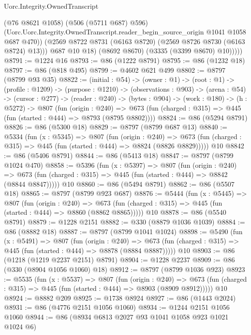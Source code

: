 \begin{lexlean}{Uorc.Integrity.OwnedTranscript}
\begin{coremodule}
                  (@76 @8621 @1058)
                  (@506 (@5711 @687) @596)
                  (Uorc.Uorc.Integrity.OwnedTranscript.reader_begin_source_origin
                    @1041
                    @1058
                    @687
                    @470))
                (@2569 @8722 @8731 (@6163 @8720) (@2569 @8726 @8730 (@6163 @8724) @13)))
              @687
              @10
              @18)
            (@8692 @8670)
            (@3335 (@3399 @8670) @10)))))
@8791 := @1224 @16
@8793 := @86 (@1222 @8791)
@8795 := @86 (@1232 @18)
@8797 := @86 (@818 @495)
@8799 := @4602 @621 @499
@8802 := @8797 (@8799 @93 @35)
@8822 := (initial : @54) ->
  (owner : @1) ->
  (root : @1) ->
  (profile : @1209) ->
  (purpose : @1210) ->
  (observations : @903) ->
  (arena : @54) ->
  (cursor : @277) ->
  (reader : @240) ->
  (bytes : @904) ->
  (work : @180) ->
  (h : @5272) ->
  @807
    (fun (origin : @240) =>
    @673 (fun (charged : @315) => @445 (fun (started : @444) => @8793 (@8795 @8802))))
@8824 := @86 (@5294 @8791)
@8826 := @86 (@5300 @18)
@8829 := @8797 (@8799 @687 @13)
@8840 := @5334
    (fun (x : @5345) =>
    @807
      (fun (origin : @240) =>
      @673 (fun (charged : @315) => @445 (fun (started : @444) => @8824 (@8826 @8829)))))
    @10
@8842 := @86 (@5406 @8791)
@8844 := @86 (@5413 @18)
@8847 := @8797 (@8799 @1024 @470)
@8858 := @5396
    (fun (x : @5397) =>
    @807
      (fun (origin : @240) =>
      @673 (fun (charged : @315) => @445 (fun (started : @444) => @8842 (@8844 @8847)))))
    @10
@8860 := @86 (@5494 @8791)
@8862 := @86 (@5507 @18)
@8865 := @8797 (@8799 @923 @687)
@8876 := @5444
    (fun (x : @5445) =>
    @807
      (fun (origin : @240) =>
      @673 (fun (charged : @315) => @445 (fun (started : @444) => @8860 (@8862 @8865)))))
    @10
@8878 := @86 (@5540 @8791)
@8879 := @1228 @2151
@8882 := @330 (@8879 @1036 @1039)
@8884 := @86 (@8882 @18)
@8887 := @8797 (@8799 @1041 @1024)
@8898 := @5490
    (fun (x : @5491) =>
    @807
      (fun (origin : @240) =>
      @673 (fun (charged : @315) => @445 (fun (started : @444) => @8878 (@8884 @8887)))))
    @10
@8903 := @86 (@1218 (@1219 @2237 @2151) @8791)
@8904 := @1228 @2237
@8909 := @86 (@330 (@8904 @1056 @1060) @18)
@8912 := @8797 (@8799 @1036 @923)
@8923 := @5535
    (fun (x : @5537) =>
    @807
      (fun (origin : @240) =>
      @673 (fun (charged : @315) => @445 (fun (started : @444) => @8903 (@8909 @8912)))))
    @10
@8924 := @8882 @209
@8925 := @1738 @8924
@8927 := @86 (@1443 @2024)
@8931 := @86 (@4776 @2151 @1056 @1060)
@8934 := @1244 @2151 @1056 @1060
@8944 := @86 (@8934 @6813 @2027 @93 @1041 @1058 @923 @1021 @1024 @6)

\end{coremodule}
\end{lexlean}
